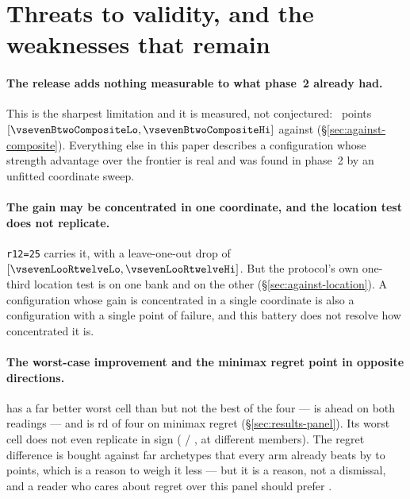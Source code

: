 \section{Threats to validity, and the weaknesses that remain}
\label{sec:limitations}

\paragraph{The release adds nothing measurable to what phase~2 already had.}
This is the sharpest limitation and it is measured, not conjectured:
\vsevenBtwoComposite{}~points $[\vsevenBtwoCompositeLo, \vsevenBtwoCompositeHi]$ against \composite{}
(\S\ref{sec:against-composite}). Everything else in this paper describes a configuration whose strength
advantage over the \vsix{} frontier is real and was found in phase~2 by an unfitted coordinate sweep.

\paragraph{The gain may be concentrated in one coordinate, and the location test does not
replicate.}
\texttt{r12=25} carries it, with a leave-one-out drop of \vsevenLooRtwelve{}
$[\vsevenLooRtwelveLo, \vsevenLooRtwelveHi]$. But the protocol's own one-third location test is
\vsevenLocVerdictOne{} on one bank and \vsevenLocVerdictThree{} on the other
(\S\ref{sec:against-location}). A configuration whose gain is concentrated in a single coordinate is
also a configuration with a single point of failure, and this battery does not resolve how concentrated
it is.

\paragraph{The worst-case improvement and the minimax regret point in opposite directions.}
\frozen{} has a far better worst cell than \incumbent{} but not the best of the four ---
\composite{} is ahead on both readings --- and \frozen{} is \vsevenRegretFrozenRank{}rd of four on
minimax regret (\S\ref{sec:results-panel}). Its worst cell does not even replicate in sign
(\vsevenWorstFrozenBankOne{} / \vsevenWorstFrozenBankTwo{}, at different members). The regret difference is bought against far archetypes that
every arm already beats by \vsevenFarSpanLo{} to \vsevenFarSpanHi{} points, which is a reason to
weigh it less --- but it
is a reason, not a dismissal, and a reader who cares about regret over this panel should prefer
\fcheap{}.

